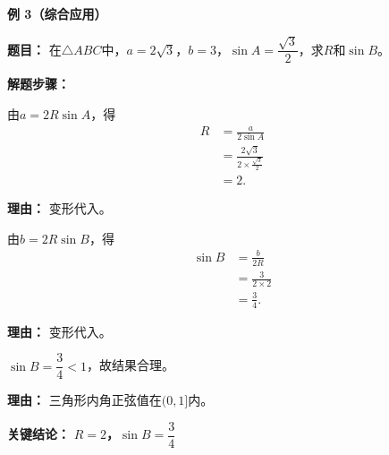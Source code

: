\begin{examplebox}
	\medskip
	\textbf{\textcolor{CExample}{例 3（综合应用）}}

	\textbf{\textcolor{CExample}{题目：}}
	在$\triangle ABC$中，$a=2\sqrt3$，$b=3$，$\sin A=\dfrac{\sqrt3}{2}$，求$R$和$\sin B$。

	\textbf{\textcolor{CExample}{解题步骤：}}
	\begin{description}[style=nextline, leftmargin=2.8em, labelsep=0.5em, itemsep=0.45em]
		\item[\textbf{第一步（求R）：}] 由$a=2R\sin A$，得
			\[
				\begin{aligned}
					R &= \frac{a}{2\sin A} \\
					&= \frac{2\sqrt3}{2\times\frac{\sqrt3}{2}} \\
					&= 2.
			\end{aligned}
			\]
			\par\textbf{理由：} 变形代入。
		\item[\textbf{第二步（求sinB）：}] 由$b=2R\sin B$，得
			\[
				\begin{aligned}
					\sin B &= \frac{b}{2R} \\
					&= \frac{3}{2\times2} \\
					&= \frac{3}{4}.
			\end{aligned}
			\]
			\par\textbf{理由：} 变形代入。
		\item[\textbf{第三步（检验）：}] $\sin B=\dfrac34<1$，故结果合理。
			\par\textbf{理由：} 三角形内角正弦值在$(0,1]$内。
	\end{description}

	\textbf{\textcolor{CExample}{关键结论：}}
	\textbf{$R=2$，$\sin B=\dfrac34$}
\end{examplebox}
